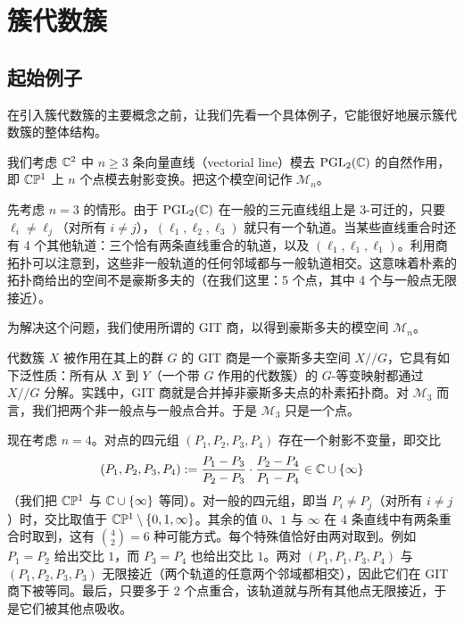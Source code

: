 \chapter{簇代数簇}


\section{起始例子}

在引入簇代数簇的主要概念之前，让我们先看一个具体例子，它能很好地展示簇代数簇的整体结构。

我们考虑 $\mathbb{C}^2$ 中 $n\ge 3$ 条向量直线（vectorial line）模去 $\operatorname{PGL}_2(\mathbb{C})$ 的自然作用，即 $\mathbb{C}\mathbb{P}^1$ 上 $n$ 个点模去射影变换。把这个模空间记作 $\mathcal{M}_n$。

先考虑 $n=3$ 的情形。由于 $\operatorname{PGL}_2(\mathbb{C})$ 在一般的三元直线组上是 3-可迁的，只要 $\ell_i\ne\ell_j$（对所有 $i\ne j$），$(\ell_1,\ell_2,\ell_3)$ 就只有一个轨道。当某些直线重合时还有 4 个其他轨道：三个恰有两条直线重合的轨道，以及 $(\ell_1,\ell_1,\ell_1)$。利用商拓扑可以注意到，这些非一般轨道的任何邻域都与一般轨道相交。这意味着朴素的拓扑商给出的空间不是豪斯多夫的（在我们这里：5 个点，其中 4 个与一般点无限接近）。

为解决这个问题，我们使用所谓的 GIT 商，以得到豪斯多夫的模空间 $\mathcal{M}_n$。

代数簇 $X$ 被作用在其上的群 $G$ 的 GIT 商是一个豪斯多夫空间 $X//G$，它具有如下泛性质：所有从 $X$ 到 $Y$（一个带 $G$ 作用的代数簇）的 $G$-等变映射都通过 $X//G$ 分解。实践中，GIT 商就是合并掉非豪斯多夫点的朴素拓扑商。对 $\mathcal{M}_3$ 而言，我们把两个非一般点与一般点合并。于是 $\mathcal{M}_3$ 只是一个点。

现在考虑 $n=4$。对点的四元组 $(P_1,P_2,P_3,P_4)$ 存在一个射影不变量，即交比
\[
(P_1,P_2,P_3,P_4):=\frac{P_1-P_3}{P_2-P_3}\cdot\frac{P_2-P_4}{P_1-P_4}\in\mathbb{C}\cup\{\infty\}
\]
（我们把 $\mathbb{C}\mathbb{P}^1$ 与 $\mathbb{C}\cup\{\infty\}$ 等同）。对一般的四元组，即当 $P_i\ne P_j$（对所有 $i\ne j$）时，交比取值于 $\mathbb{C}\mathbb{P}^1\setminus\{0,1,\infty\}$。其余的值 $0$、$1$ 与 $\infty$ 在 4 条直线中有两条重合时取到，这有 $\binom{4}{2}=6$ 种可能方式。每个特殊值恰好由两对取到。例如 $P_1=P_2$ 给出交比 $1$，而 $P_3=P_4$ 也给出交比 $1$。两对 $(P_1,P_1,P_3,P_4)$ 与 $(P_1,P_2,P_3,P_3)$ 无限接近（两个轨道的任意两个邻域都相交），因此它们在 GIT 商下被等同。最后，只要多于 2 个点重合，该轨道就与所有其他点无限接近，于是它们被其他点吸收。

